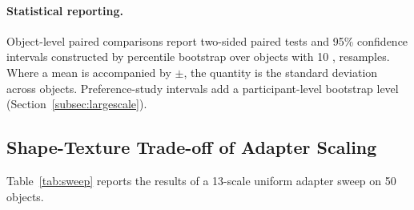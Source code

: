 \documentclass[times,twocolumn,final]{elsarticle}
\providecommand{\DIFadd}[1]{{\protect\color{red} \sf #1}} %
\providecommand{\DIFaddend}{} %
\DeclareRobustCommand{\DIFaddend}{\DIFOaddend \let\includegraphics\DIFOincludegraphics} %
\begin{document}
\paragraph{\DIFadd{Statistical reporting.}}
\DIFadd{Object-level paired comparisons report two-sided paired tests and 95\% confidence intervals constructed by percentile bootstrap over objects with 10}{\DIFadd{,}}\DIFadd{000 resamples. Where a mean is accompanied by $\pm$, the quantity is the standard deviation across objects. Preference-study intervals add a participant-level bootstrap level (Section~\ref{subsec:largescale})}\DIFaddend .

\subsection{Shape-Texture Trade-off of Adapter Scaling}
\label{subsec:tradeoff}

Table~\ref{tab:sweep} reports the results of a 13-scale uniform adapter sweep on 50 objects.

\begin{table}[t]
\centering
\caption{Uniform adapter scale sweep results.}
\label{tab:sweep}
\small
{}
\end{table}
\end{document}
